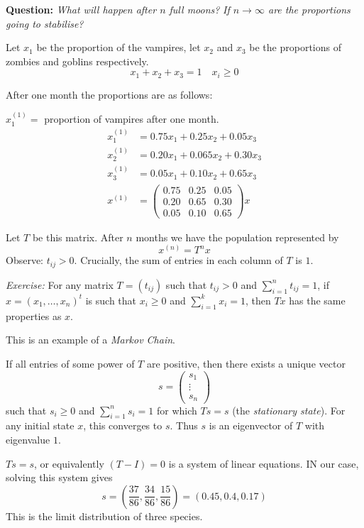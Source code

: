 \documentclass[10pt]{scrartcl}
\begin{document}
\textbf{Question:} \emph{What will happen after $n$ full moons?} \emph{If $n \to \infty$ are the proportions going to stabilise?} 

Let $x_1$ be the proportion of the vampires, let $x_2$ and $x_3$ be the proportions of zombies and goblins respectively. 
\[
  x_1+ x_2 + x_3 = 1\quad x_i \geq 0
\]

After one month the proportions are as follows: 

$x_1^{(1)} = $ proportion of vampires after one month. 
\begin{align*}
  x_1^{(1)} &= 0.75x_1 + 0.25x_2 + 0.05x_3\\
  x_2^{(1)} &= 0.20x_1 + 0.065x_2 + 0.30x_3\\
  x_3^{(1)} &= 0.05x_1 + 0.10x_2 + 0.65x_3\\[0.2cm]
  x^{(1)} &= \begin{pmatrix}
 0.75 & 0.25 & 0.05\\ 
 0.20 & 0.65 & 0.30\\
 0.05 & 0.10 & 0.65	
 \end{pmatrix}x
\end{align*}

Let $T$ be this matrix. After $n$ months we have the population represented by 
\[
  x^{(n)} = T^nx
\]
Observe: $t_{ij} > 0$. Crucially, the sum of entries in each column of $T$ is $1$. 

\emph{Exercise:} For any matrix $T = (t_{ij})$ such that $t_{ij}> 0$ and $\sum_{i=1}^n t_{ij} = 1$, if $x = (x_1,\dots,x_n)^t$ is such that $x_i\geq 0$ and $\sum_{i=1}^k x_i = 1$, then $Tx$ has the same properties as $x$. 

This is an example of a \emph{Markov Chain}. 

\begin{theorem}
If all entries of some power of $T$ are positive, then there exists a unique vector \[s = \left(\begin{smallmatrix}
s_1\\\vdots\\s_n	
\end{smallmatrix}\right)\] such that $s_i \geq 0$ and $\sum_{i=1}^n s_i = 1$ for which $Ts = s$ (the \emph{stationary state}). For any initial state $x$, this converges to $s$. Thus $s$ is an eigenvector of $T$ with eigenvalue $1$. 
\end{theorem}


$Ts = s$, or equivalently $(T-I) = 0$ is a system of linear equations. IN our case, solving this system gives 
\[
  s =  \textstyle{(\frac{37}{86},\frac{34}{86},\frac{15}{86}) = (0.45,0.4,0.17)
}
\]
This is the limit distribution of three species. 
\end{document}
